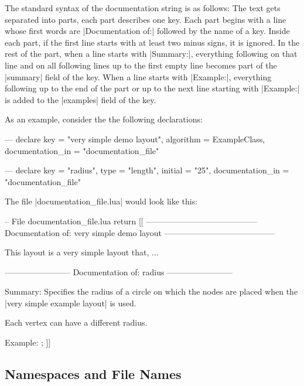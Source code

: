 The standard syntax of the documentation string is as follows: 
The text gets separated into parts, each part describes one key. Each
part begins with a line whose first words are |Documentation of:|
followed by the name of a key. Inside each part, if the first line
starts with at least two minus signs, it is ignored.
In the rest of the part, when a line starts with |Summary:|,
everything following on that line and on all following lines up to
the first empty line becomes part of the |summary| field of the
key. When a line starts with |Example:|, everything following up to
the end of the part or up to the next line starting with |Example:|
is added to the |examples| field of the key.

As an example, consider the the following declarations:

\begin{codeexample}
---
declare {
  key               = "very simple demo layout",
  algorithm         = ExampleClass,
  documentation_in  = "documentation_file"
}

--- 
declare {
  key               = "radius",
  type              = "length",
  initial           = "25",
  documentation_in  = "documentation_file"
}
\end{codeexample}

The file |documentation_file.lua| would look like this:

\begin{codeexample}
-- File documentation_file.lua
return [[
-----------------------------------------
Documentation of: very simple demo layout
-----------------------------------------

This layout is a very simple layout that, ...

------------------------  
Documentation of: radius
------------------------

Summary: Specifies the radius of a circle on which the nodes are
placed when the |very simple example layout| is used.

Each vertex can have a  different radius. %

Example:
\tikz {};
]]
\end{codeexample}




\subsection{Namespaces and File Names}

